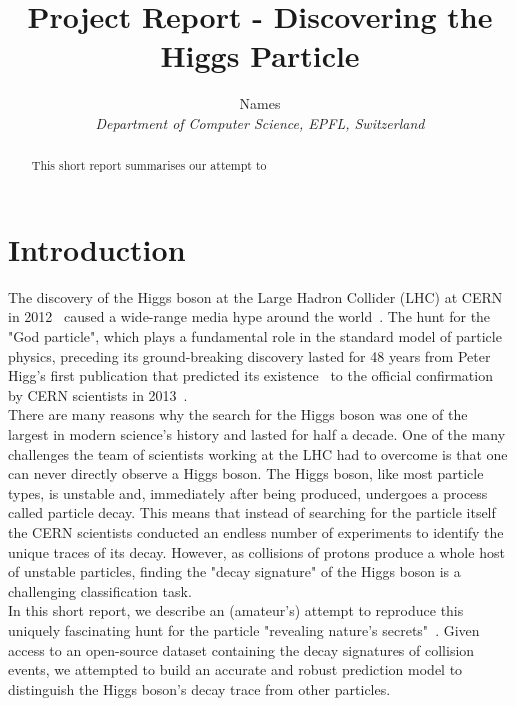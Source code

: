 \documentclass[10pt,conference,compsocconf]{IEEEtran}
\begin{document}
\title{Project Report - Discovering the Higgs Particle}

\author{
  Names\\
  \textit{Department of Computer Science, EPFL, Switzerland}
}

\maketitle

\begin{abstract}
This short report summarises our attempt to 
\end{abstract}


\section{Introduction}

The discovery of the Higgs boson at the Large Hadron Collider (LHC) at CERN in 2012~\cite{Aad2012} caused a wide-range media hype around the world~\cite{Guardian}. The hunt for the "God particle", which plays a fundamental role in the standard model of particle physics, preceding its ground-breaking discovery lasted for 48 years from Peter Higg's first publication that predicted its existence~\cite{Higgs1964} to the official confirmation by CERN scientists in 2013~\cite{CERN}.\\
There are many reasons why the search for the Higgs boson was one of the largest in modern science's history and lasted for half a decade. One of the many challenges the team of scientists working at the LHC had to overcome is that one can never directly observe a Higgs boson. The Higgs boson, like most particle types, is unstable and, immediately after being produced, undergoes a process called particle decay. This means that instead of searching for the particle itself the CERN scientists conducted an endless number of experiments to identify the unique traces of its decay. However, as collisions of protons produce a whole host of unstable particles, finding the "decay signature" of the Higgs boson is a challenging classification task.\\
In this short report, we describe an (amateur's) attempt to reproduce this uniquely fascinating hunt for the particle "revealing nature's secrets"~\cite{CERN}. Given access to an open-source dataset containing the decay signatures of collision events, we attempted to build an accurate and robust prediction model to distinguish the Higgs boson's decay trace from other particles.
\end{document}
